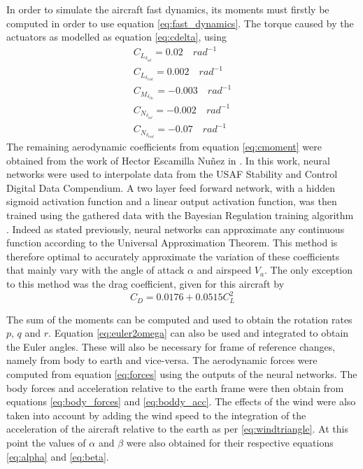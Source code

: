 In order to simulate the aircraft fast dynamics, its moments must firstly be computed in order to use equation \ref{eq:fast_dynamics}. The torque caused by the actuators as modelled as equation \ref{eq:cdelta}, using
\begin{gather*}
C_{L_{\delta_{ail}}}=0.02 \quad rad^{-1}\\
C_{L_{\delta_{rud}}}=0.002 \quad rad^{-1}\\
C_{M_{\delta_{ele}}}=-0.003 \quad rad^{-1}\\
C_{N_{\delta_{ail}}}= -0.002 \quad rad^{-1}\\
C_{N_{\delta_{rud}}}= -0.07 \quad rad^{-1}
\end{gather*}
The remaining aerodynamic coefficients from equation \ref{eq:cmoment} were obtained from the work of Hector Escamilla Nuñez in \cite{hector}. In this work, neural networks were used to interpolate data from the USAF Stability and Control Digital Data Compendium. A two layer feed forward network, with a hidden sigmoid activation function and a linear output activation function, was then trained using the gathered data with the Bayesian Regulation training algorithm \cite{hector}. Indeed as stated previously, neural networks can approximate any continuous function according to the Universal Approximation Theorem. This method is therefore optimal to accurately approximate the variation of these coefficients that mainly vary with the angle of attack $\alpha$ and airspeed $V_a$. The only exception to this method was the drag coefficient, given for this aircraft by
\begin{equation}
C_D=0.0176+0.0515 C_L^2
\label{eq:cd_cl}
\end{equation}

The sum of the moments can be computed and used to obtain the rotation rates $p$, $q$ and $r$. Equation \ref{eq:euler2omega} can also be used and integrated to obtain the Euler angles. These will also be necessary for frame of reference changes, namely from body to earth and vice-versa. The aerodynamic forces were computed from equation \ref{eq:forces} using the outputs of the neural networks. The body forces and acceleration relative to the earth frame were then obtain from equations \ref{eq:body_forces} and \ref{eq:boddy_acc}. 
The effects of the wind were also taken into account by adding the wind speed to the integration of the acceleration of the aircraft relative to the earth as per \ref{eq:windtriangle}. At this point the values of $\alpha$ and $\beta$ were also obtained for their respective equations \ref{eq:alpha} and \ref{eq:beta}. 

